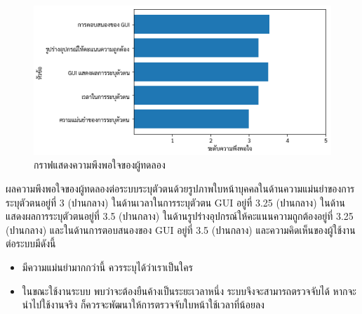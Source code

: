 \begin{figure}[!ht]
    \begin{center}
      \includegraphics[scale=.6]{pic/test_graph.png}
      \caption[กราฟแสดงความพึงพอใจของผู้ทดลอง]{กราฟแสดงความพึงพอใจของผู้ทดลอง}
      \label{fig:bar_graph}
    \end{center}
  \end{figure}

\indent ผลความพึงพอใจของผู้ทดลองต่อระบบระบุตัวตนด้วยรูปภาพใบหน้าบุคคลในด้านความแม่นยำของการระบุตัวตนอยู่ที่ 3 (ปานกลาง) ในด้านเวลาในการระบุตัวตน GUI อยู่ที่ 3.25 (ปานกลาง)
ในด้านแสดงผลการระบุตัวตนอยู่ที่ 3.5 (ปานกลาง) ในด้านรูปร่างอุปกรณ์ให้คะแนนความถูกต้องอยู่ที่ 3.25 (ปานกลาง)  และในด้านการตอบสนองของ GUI อยู่ที่ 3.5 (ปานกลาง) 
และความคิดเห็นของผู้ใช้งานต่อระบบมีดังนี้
\begin{itemize}
  \item มีความแม่นยำมากกว่านี้ ควรระบุได้ว่าเราเป็นใคร
  \item ในขณะใช้งานระบบ พบว่าจะต้องยืนค้างเป็นระยะเวลาหนึ่ง ระบบจึงจะสามารถตรวจจับได้ หากจะนำไปใช้งานจริง ก็ควรจะพัฒนาให้การตรวจจับใบหน้าใช้เวลาที่น้อยลง 
\end{itemize}